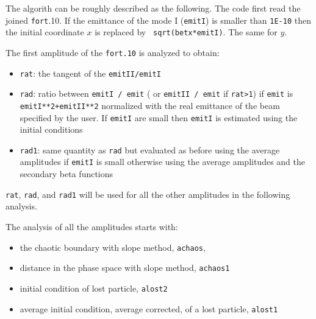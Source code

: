 \documentclass{article}    %
\begin{document}


The algorith can be roughly described as the following. The code first read
the joined {\tt fort}.10.  If the emittance of the mode I ({\tt emitI}) is
smaller than {\tt 1E-10} then the initial coordinate $x$ is replaced by {\tt
sqrt(betx*emitI)}. The same for $y$.


The first amplitude of the {\tt fort.10} is analyzed to obtain:
\begin{itemize}
\item {\tt rat}: the tangent of the {\tt emitII/emitI}
\item {\tt rad}: ratio between {\tt emitI / emit} (
or {\tt emitII / emit} if {\tt rat>1}) if {\tt emit} is {\tt
emitI**2+emitII**2} normalized with the real emittance of the beam specified
by the user.  If {\tt emitI} are small then {\tt emitI} is estimated using the
initial conditions
\item {\tt rad1}: same quantity as {\tt rad} but evaluated as before using the
average amplitudes if {\tt emitI} is small otherwise using the average
amplitudes and the secondary beta functions
\end{itemize}

{\tt rat}, {\tt rad}, and {\tt rad1} will be used for all the other amplitudes
in the following analysis.


The analysis of all the amplitudes starts with:
\begin{itemize}
\item the chaotic boundary with slope method, {\tt achaos},
\item distance in the phase space with slope method, {\tt achaos1}
\item initial condition of lost particle, {\tt alost2}
\item average initial condition, average corrected, of a lost particle,
  {\tt alost1}
\end{itemize}
\end{document}
